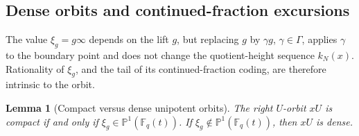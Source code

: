 \documentclass[11pt]{amsart}
\theoremstyle{definition}
\theoremstyle{plain}
\newtheorem{lemma}[definition]{Lemma}
\newcommand{\Fq}{\mathbb F_q}
\begin{document}
\subsection{Dense orbits and continued-fraction excursions}
The value \(\xi_g=g\infty\) depends on the lift \(g\), but replacing \(g\) by
\(\gamma g\), \(\gamma\in\Gamma\), applies \(\gamma\) to the boundary point and
does not change the quotient-height sequence \(k_N(x)\).  Rationality of
\(\xi_g\), and the tail of its continued-fraction coding, are therefore
intrinsic to the orbit.

\begin{lemma}[Compact versus dense unipotent orbits]
\label{lem:irrational-dense}
The right \(U\)-orbit \(xU\) is compact if and only if
\(\xi_g\in\mathbb P^1(\Fq(t))\).  If
\(\xi_g\notin\mathbb P^1(\Fq(t))\), then \(xU\) is dense.
\end{lemma}
\end{document}
